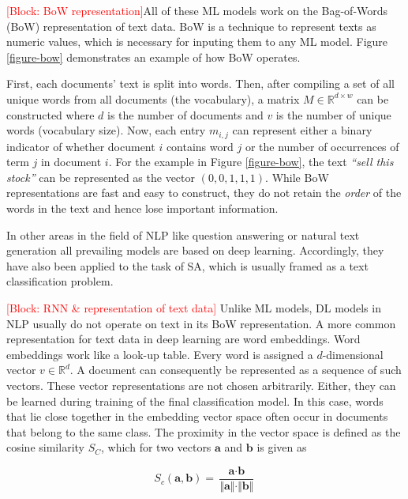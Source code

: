 \textcolor{red}{[Block: BoW representation]}All of these ML models work on the Bag-of-Words (BoW) representation of text data. BoW is a technique to represent texts as numeric values, which is necessary for inputing them to any ML model. Figure \ref{figure-bow} demonstrates an example of how BoW operates.



 First, each documents' text is split into words. Then, after compiling a set of all unique words from all documents (the vocabulary), a matrix $M \in \mathbb{R}^{d \times w}$ can be constructed where $d$ is the number of documents and $v$ is the number of unique words (vocabulary size). Now, each entry $m_{i,j}$ can represent either a binary indicator of whether document $i$ contains word $j$ or the number of occurrences of term $j$ in document $i$. For the example in Figure \ref{figure-bow}, the text \emph{``sell this stock''} can be represented as the vector $(0,0,1,1,1)$. While BoW representations are fast and easy to construct, they do not retain the \emph{order} of the words in the text and hence lose important information.

In other areas in the field of NLP like question answering or natural text generation all prevailing models are based on deep learning. Accordingly, they have also been applied to the task of SA, which is usually framed as a text classification problem. 

\textcolor{red}{[Block: RNN \& representation of text data]} Unlike ML models, DL models in NLP usually do not operate on text in its BoW representation. A more common representation for text data in deep learning are word embeddings. Word embeddings work like a look-up table. Every word is assigned a $d$-dimensional vector $v \in \mathbb{R}^{d}$. A document can consequently be represented as a sequence of such vectors. These vector representations are not chosen arbitrarily. Either, they can be learned during training of the final classification model. In this case, words that lie close together in the embedding vector space often occur in documents that belong to the same class. The proximity in the vector space is defined as the cosine similarity $S_C$, which for two vectors $\textbf{a}$ and $\textbf{b}$ is given as

\begin{equation}
	S_c(\textbf{a}, \textbf{b}) = \frac{\textbf{a} \cdot \textbf{b}}{\Vert \textbf{a} \Vert \cdot \Vert \textbf{b} \Vert}
\end{equation} 

